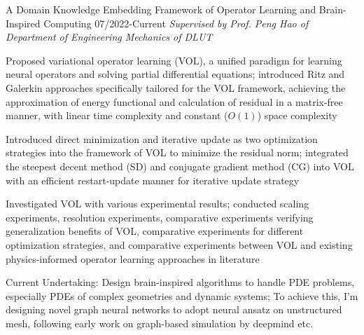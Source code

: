 
\begin{cventries2}


  \cventrynew
    {A Domain Knowledge Embedding Framework of Operator Learning and Brain-Inspired Computing} %
    {07/2022-Current} %
    {\textnormal{\textit{Supervised by Prof. Peng Hao of Department of Engineering Mechanics of DLUT}
    }}
    {
      \begin{cvitems} %
        \item Proposed variational operator learning (VOL), a unified paradigm for learning neural operators and solving partial differential equations; introduced Ritz and Galerkin approaches specifically tailored for the VOL framework, achieving the approximation of energy functional and calculation of residual in a matrix-free manner, with linear time complexity and constant ($O(1)$) space complexity
		    \item Introduced direct minimization and iterative update as two optimization strategies into the framework of VOL to minimize the residual norm; integrated the steepest decent method (SD) and conjugate gradient method (CG) into VOL with an efficient restart-update manner for iterative update strategy
		    \item Investigated VOL with various experimental results; conducted scaling experiments, resolution experiments, comparative experiments verifying generalization benefits of VOL, comparative experiments for different optimization strategies, and comparative experiments between VOL and existing physics-informed operator learning approaches in literature
		    \item {\color{blue} Current Undertaking: Design brain-inspired algorithms to handle PDE problems, especially PDEs of complex geometries and dynamic systems; To achieve this, I'm designing novel graph neural networks to adopt neural ansatz on unstructured mesh, following early work on graph-based simulation by deepmind etc.}

\end{cvitems}}
\end{cventries2}
